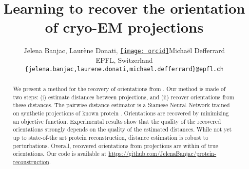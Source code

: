 \documentclass{article}
\author{
    Jelena Banjac, Laurène Donati, \href{https://orcid.org/0000-0000-0000-0000}{\texttt{[image: orcid]}\hspace{1mm}}Michaël Defferrard \\
    EPFL, Switzerland \\
    \texttt{\{jelena.banjac,laurene.donati,michael.defferrard\}@epfl.ch}
}
\title{Learning to recover the orientation of cryo-EM projections}
\begin{document}
\maketitle

\begin{abstract}
    We present a method for the recovery of orientations from . 
    Our method is made of two steps: (i) estimate distances between projections, and (ii) recover orientations from these distances.
    The pairwise distance estimator is a Siamese Neural Network trained on synthetic projections of known protein .
    Orientations are recovered by minimizing an objective function.
    Experimental results show that the quality of the recovered orientations strongly depends on the quality of the estimated distances.
    While not yet up to state-of-the art protein reconstruction, distance estimation is robust to perturbations.
    Overall, recovered orientations from  projections are within \todo{10\degree} of true orientations.
    Our code is available at \url{https://github.com/JelenaBanjac/protein-reconstruction}.
\end{abstract}
\end{document}
